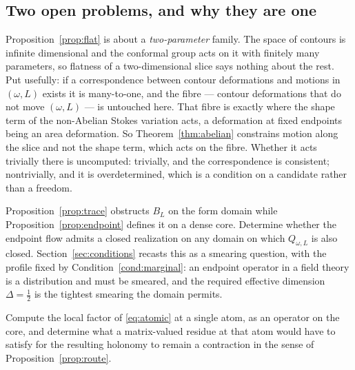 \subsection{Two open problems, and why they are one}

\begin{remark}
\label{rem:fibre}
Proposition~\ref{prop:flat} is about a \emph{two-parameter} family. The space of
contours is infinite dimensional and the conformal group acts on it with finitely
many parameters, so flatness of a two-dimensional slice says nothing about the
rest. Put usefully: if a correspondence between contour deformations and motions
in $(\omega,L)$ exists it is many-to-one, and the fibre --- contour deformations
that do not move $(\omega,L)$ --- is untouched here. That fibre is exactly where
the shape term of the non-Abelian Stokes variation acts, a deformation at fixed
endpoints being an area deformation. So Theorem~\ref{thm:abelian} constrains
motion along the slice and not the shape term, which acts on the fibre. Whether
it acts trivially there is uncomputed: trivially, and the correspondence is
consistent; nontrivially, and it is overdetermined, which is a condition on a
candidate rather than a freedom.
\end{remark}

\begin{problem}
\label{prob:trace}
Proposition~\ref{prop:trace} obstructs $B_L$ on the form domain while
Proposition~\ref{prop:endpoint} defines it on a dense core. Determine whether the
endpoint flow admits a closed realization on any domain on which $Q_{\omega,L}$ is
also closed. Section~\ref{sec:conditions} recasts this as a smearing question,
with the profile fixed by Condition~\ref{cond:marginal}: an endpoint operator in
a field theory is a distribution and must be smeared, and the required effective
dimension $\Delta=\frac12$ is the tightest smearing the domain permits.
\end{problem}

\begin{problem}\label{prob:curvature}
Compute the local factor of \eqref{eq:atomic} at a single atom, as an operator on
the core, and determine what a matrix-valued residue at that atom would have to
satisfy for the resulting holonomy to remain a contraction in the sense of
Proposition~\ref{prop:route}.
\end{problem}

